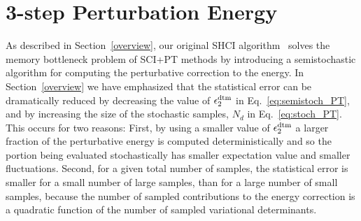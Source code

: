 \documentclass[%
preprint,
 superscriptaddress,
 amsmath,amssymb,
 aps,
]{revtex4-1}
\begin{document}
\section{3-step Perturbation Energy}
\label{multi}

As described in Section~\ref{overview}, our original SHCI algorithm~\cite{ShaHolJeaAlaUmr-JCTC-17} solves the memory bottleneck problem of SCI+PT methods
by introducing a semistochastic algorithm for computing the perturbative correction to the energy.
In Section~\ref{overview} we have emphasized that the
statistical error can be dramatically reduced
by decreasing the value of $\epsilon_2^{\rm dtm}$ in Eq.~\ref{eq:semistoch_PT}, and by increasing the size of the stochastic samples, $N_d$ in Eq.~\ref{eq:stoch_PT}.
This occurs for two reasons:
First, by using a smaller value of $\epsilon_{2} ^{\rm dtm}$ a larger fraction of the perturbative energy is computed deterministically
and so the portion being evaluated stochastically has smaller expectation value and smaller fluctuations.
Second, for a given total number of samples, the statistical error is smaller for a small number of large samples,
than for a large number of small samples, because the number of sampled contributions to the energy correction is a quadratic function
of the number of sampled variational determinants.
\end{document}
